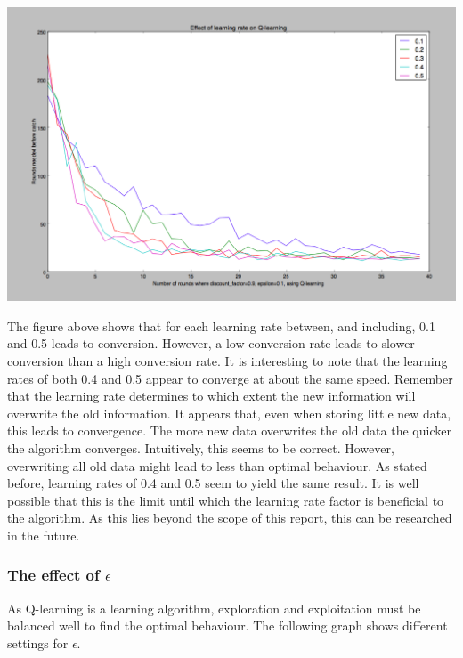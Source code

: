 \documentclass{article}
\begin{document}
\begin{center}
	\includegraphics[scale=0.4]{learning_rates}
\end{center}



The figure above shows that for each learning rate between, and including, 0.1 and 0.5 leads to conversion. However, a low conversion rate leads to slower conversion than a high conversion rate. It is interesting to note that the learning rates of both 0.4 and 0.5 appear to converge at about the same speed. Remember that the learning rate determines to which extent the new information will overwrite the old information. It appears that, even when storing little new data, this leads to convergence. The more new data overwrites the old data the quicker the algorithm converges. Intuitively, this seems to be correct. However, overwriting all old data might lead to less than optimal behaviour. As stated before, learning rates of 0.4 and 0.5 seem to yield the same result. It is well possible that this is the limit until which the learning rate factor is beneficial to the algorithm. As this lies beyond the scope of this report, this can be researched in the future.
\subsubsection{The effect of $\epsilon$}
As Q-learning is a learning algorithm, exploration and exploitation must be balanced well to find the optimal behaviour. The following graph shows different settings for $\epsilon$. 
\end{document}
